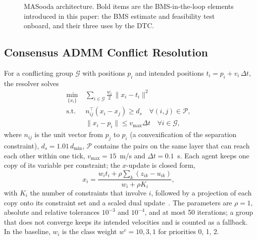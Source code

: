\documentclass[journal]{IEEEtran}
\begin{document}
\begin{figure}[t]
{}
\caption{MASooda architecture. Bold items are the BMS-in-the-loop elements introduced in this paper: the BMS estimate and feasibility test onboard, and their three uses by the DTC.}
\label{fig:arch}
\end{figure}

\subsection{Consensus ADMM Conflict Resolution}\label{sec:admm}
For a conflicting group $\mathcal{G}$ with positions $p_i$ and intended positions $t_i = p_i + v_i\,\Delta t$, the resolver solves
\begin{align}
\min_{\{x_i\}} \; & \sum_{i \in \mathcal{G}} \tfrac{w_i}{2}\,\|x_i - t_i\|^2 \label{eq:admm}\\
\text{s.t.}\; & n_{ij}^{\top}(x_i - x_j) \ge d_s \quad \forall (i,j) \in \mathcal{P}, \nonumber\\
& \|x_i - p_i\| \le v_{\max}\Delta t \quad \forall i \in \mathcal{G}, \nonumber
\end{align}
where $n_{ij}$ is the unit vector from $p_j$ to $p_i$ (a convexification of the separation constraint), $d_s = 1.01\,d_{\min}$, $\mathcal{P}$ contains the pairs on the same layer that can reach each other within one tick, $v_{\max} = 15$~m/s and $\Delta t = 0.1$~s. Each agent keeps one copy of its variable per constraint; the $x$-update is closed form,
\begin{equation}
x_i = \frac{w_i t_i + \rho \sum_{k}(z_{ik} - u_{ik})}{w_i + \rho K_i},
\label{eq:xupdate}
\end{equation}
with $K_i$ the number of constraints that involve $i$, followed by a projection of each copy onto its constraint set and a scaled dual update~\cite{boyd2011admm}. The parameters are $\rho = 1$, absolute and relative tolerances $10^{-3}$ and $10^{-4}$, and at most 50 iterations; a group that does not converge keeps its intended velocities and is counted as a fallback. In the baseline, $w_i$ is the class weight $w^{c} = 10, 3, 1$ for priorities 0, 1, 2.
\end{document}
